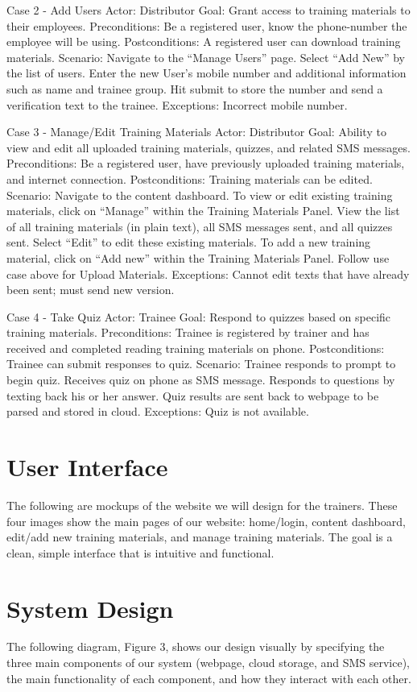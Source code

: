 Case 2 - Add Users
Actor: Distributor
Goal: Grant access to training materials to their employees.
Preconditions: Be a registered user, know the phone-number the employee will be using.
Postconditions: A registered user can download training materials.
Scenario:
Navigate to the “Manage Users” page.
Select “Add New” by the list of users.
Enter the new User’s mobile number and additional information such as name and trainee group.
Hit submit to store the number and send a verification text to the trainee.
Exceptions: 
Incorrect mobile number.

Case 3 - Manage/Edit Training Materials
Actor: Distributor
Goal: Ability to view and edit all uploaded training materials, quizzes, and related SMS messages.
Preconditions: Be a registered user, have previously uploaded training materials, and internet connection.
Postconditions: Training materials can be edited.
Scenario: 
Navigate to the content dashboard.
To view or edit existing training materials, click on “Manage” within the Training Materials Panel.
View the list of all training materials (in plain text), all SMS messages sent, and all quizzes sent.
Select “Edit” to edit these existing materials.
To add a new training material, click on “Add new” within the Training Materials Panel.
Follow use case above for Upload Materials.
Exceptions:
Cannot edit texts that have already been sent; must send new version.

Case 4 - Take Quiz
Actor: Trainee
Goal: Respond to quizzes based on specific training materials.
Preconditions: Trainee is registered by trainer and has received and completed reading training materials on phone.
Postconditions: Trainee can submit responses to quiz.
Scenario: 
Trainee responds to prompt to begin quiz.
Receives quiz on phone as SMS message.
Responds to questions by texting back his or her answer.
Quiz results are sent back to webpage to be parsed and stored in cloud.
Exceptions:
Quiz is not available.


\section{User Interface}
The following are mockups of the website we will design for the trainers. These four images show the main pages of our website: home/login, content dashboard, edit/add new training materials, and manage training materials. The goal is a clean, simple interface that is intuitive and functional.

\section{System Design}
The following diagram, Figure 3, shows our design visually by specifying the three main components of our system (webpage, cloud storage, and SMS service), the main functionality of each component, and how they interact with each other.


